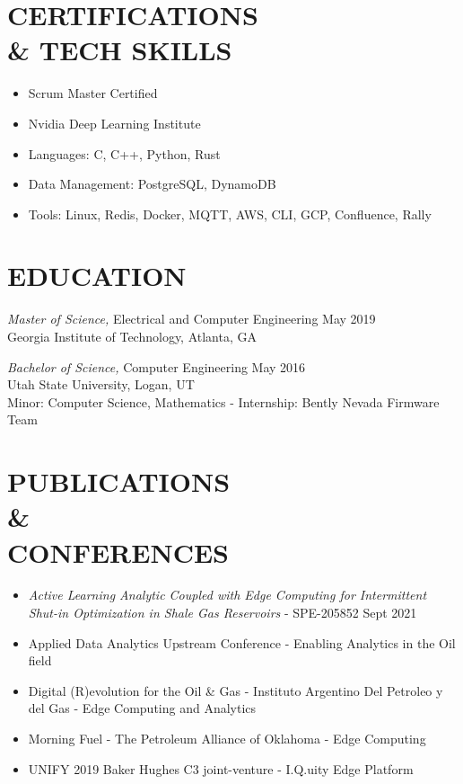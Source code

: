 \documentclass[line,margin]{res}
\begin{document}
\begin{resume}
	\section{CERTIFICATIONS\\\& TECH SKILLS}
	\begin{itemize} \itemsep -2pt
		\item Scrum Master Certified
		\item Nvidia Deep Learning Institute
		\item Languages: C, C++, Python, Rust
		\item Data Management: PostgreSQL, DynamoDB
		\item Tools: Linux, Redis, Docker, MQTT, AWS, CLI, GCP, Confluence, Rally
	\end{itemize}

	\section{EDUCATION}
	 {\sl Master of Science,} Electrical and Computer Engineering \hfill May 2019\\
	Georgia Institute of Technology, Atlanta, GA

		{\sl Bachelor of Science,} Computer Engineering \hfill May 2016\\
	Utah State University, Logan, UT\\
	Minor: Computer Science, Mathematics - Internship: Bently Nevada Firmware Team
	\section{PUBLICATIONS\\\&\\CONFERENCES}
	\begin{itemize} \itemsep -2pt
		\item {\sl Active Learning Analytic Coupled with Edge Computing for Intermittent Shut-in Optimization in Shale Gas Reservoirs} - SPE-205852 Sept 2021
		\item Applied Data Analytics Upstream Conference - Enabling Analytics in the Oil field
		\item Digital (R)evolution for the Oil \& Gas - Instituto Argentino Del Petroleo y del Gas - Edge Computing and Analytics
		\item Morning Fuel - The Petroleum Alliance of Oklahoma - Edge Computing
		\item UNIFY 2019 Baker Hughes C3 joint-venture - I.Q.uity Edge Platform
	\end{itemize}



\end{resume}
\end{document}
